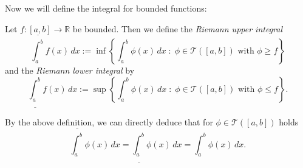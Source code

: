 

Now we will define the integral for bounded functions:

\begin{Definition}{}
Let $f:[a,b]\to\mathbb{R}$ be bounded. Then we define the \emph{Riemann upper integral}
\[\overline{\int_a^b}f(x)\, dx:=\inf\left\{\int_a^b\phi(x)\, dx\;:\;\phi\in\mathcal{T}([a,b])\text{ with }\phi\geq f\right\}\]
and the \emph{Riemann lower integral} by
\[\underline{\int_a^b}f(x)\, dx:=\sup\left\{\int_a^b\phi(x)\, dx\;:\;\phi\in\mathcal{T}([a,b])\text{ with }\phi\leq f\right\}.\]
\end{Definition}

% 


By the above definition, we can directly deduce that for $\phi\in\mathcal{T}([a,b])$ holds
\[\overline{\int_a^b}\phi(x)\, dx=\underline{\int_a^b}\phi(x)\, dx={\int_a^b}\phi(x)\, dx.\]

